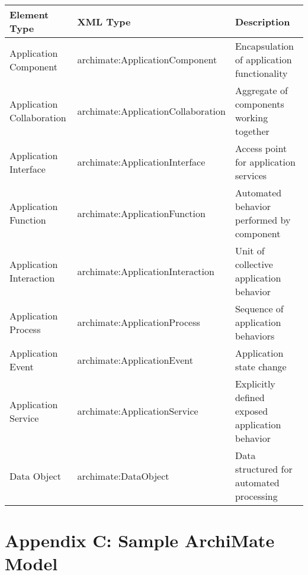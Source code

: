 \documentclass[12pt,a4paper]{report}
\begin{document}
\begin{longtable}{|l|l|p{6cm}|}
\hline
\textbf{Element Type} & \textbf{XML Type} & \textbf{Description} \\
\hline
\endhead
Application Component & archimate:ApplicationComponent & Encapsulation of application functionality \\
\hline
Application Collaboration & archimate:ApplicationCollaboration & Aggregate of components working together \\
\hline
Application Interface & archimate:ApplicationInterface & Access point for application services \\
\hline
Application Function & archimate:ApplicationFunction & Automated behavior performed by component \\
\hline
Application Interaction & archimate:ApplicationInteraction & Unit of collective application behavior \\
\hline
Application Process & archimate:ApplicationProcess & Sequence of application behaviors \\
\hline
Application Event & archimate:ApplicationEvent & Application state change \\
\hline
Application Service & archimate:ApplicationService & Explicitly defined exposed application behavior \\
\hline
Data Object & archimate:DataObject & Data structured for automated processing \\
\hline
\end{longtable}

\section{Appendix C: Sample ArchiMate Model}
\end{document}
